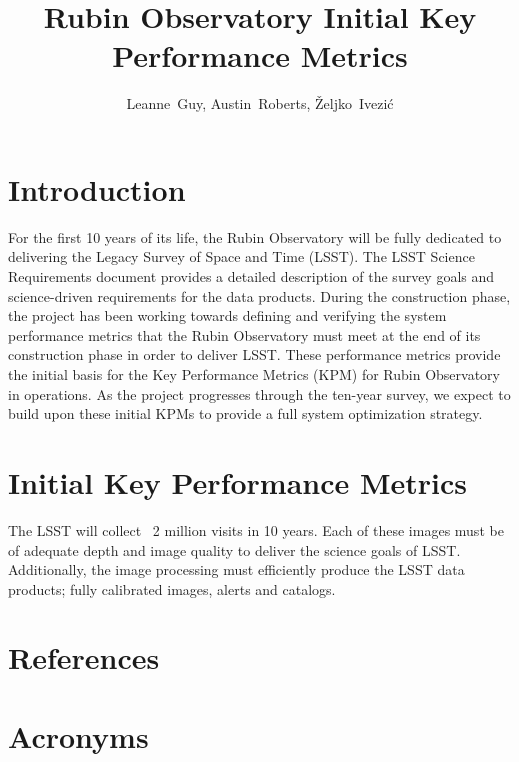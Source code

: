 \documentclass[DM,authoryear,toc]{lsstdoc}
\title{Rubin Observatory Initial Key Performance Metrics}
\author{%
Leanne~Guy, Austin~Roberts, \v{Z}eljko~Ivezi\'c
}
\date{\vcsDate}
\begin{document}
\maketitle


\section{Introduction}
For the first 10 years of its life, the Rubin Observatory will be fully dedicated to delivering the Legacy Survey of Space and Time (LSST). 
The LSST Science Requirements document  provides a detailed description of the survey goals and science-driven requirements for the data products. 
During the construction phase, the project has been working towards defining and verifying the system performance metrics that the Rubin Observatory must meet at the end of its construction phase in order to deliver LSST. 
These performance metrics provide the initial basis for the Key Performance Metrics (KPM) for Rubin Observatory in operations.
As the project progresses through the ten-year survey, we expect to build upon these initial KPMs to provide a full system optimization strategy.  


\section{Initial Key Performance Metrics}
The LSST will collect ~2 million visits in 10 years. 
Each of these images must be of adequate depth and image quality to deliver the science goals of LSST. 
Additionally, the image processing must efficiently produce the LSST data products; fully calibrated images, alerts and  catalogs.



\appendix
\section{References} \label{sec:bib}
\renewcommand{\refname}{} %


\section{Acronyms} \label{sec:acronyms}

\end{document}
